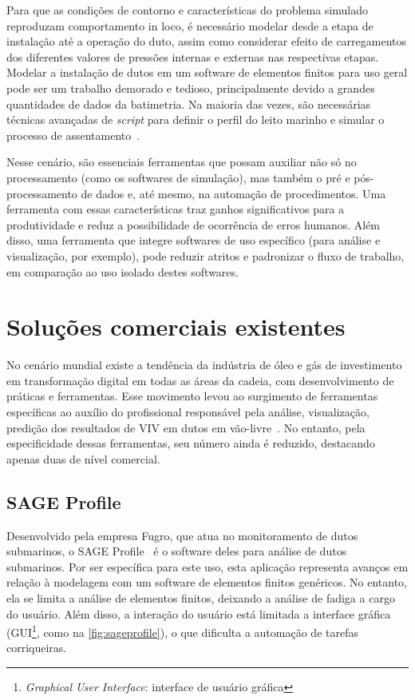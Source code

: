 Para que as condições de contorno e características do problema simulado reproduzam comportamento in loco, é necessário modelar desde a etapa de instalação até a operação do duto, assim como considerar efeito de carregamentos dos diferentes valores de pressões internas e externas nas respectivas etapas.
Modelar a instalação de dutos em um software de elementos finitos para uso geral pode ser um trabalho demorado e tedioso, principalmente devido a grandes quantidades de dados da batimetria.
Na maioria das vezes, são necessárias técnicas avançadas de \textit{script} para definir o perfil do leito marinho e simular o processo de assentamento~\cite{VandenAbeele2013}.

Nesse cenário, são essenciais ferramentas que possam auxiliar não só no processamento (como os softwares de simulação), mas também o pré e pós-processamento de dados e, até mesmo, na automação de procedimentos.
Uma ferramenta com essas características traz ganhos significativos para a produtividade e reduz a possibilidade de ocorrência de erros humanos.
Além disso, uma ferramenta que integre softwares de uso específico (para análise e visualização, por exemplo), pode reduzir atritos e padronizar o fluxo de trabalho, em comparação ao uso isolado destes softwares.


\section{Soluções comerciais existentes}


No cenário mundial existe a tendência da indústria de óleo e gás de investimento em transformação digital em todas as áreas da cadeia, com desenvolvimento de práticas e ferramentas. Esse movimento levou ao surgimento de ferramentas específicas ao auxílio do profissional responsável pela análise, visualização, predição dos resultados de VIV em dutos em vão-livre~\cite{Mittal2017}. No entanto, pela especificidade dessas ferramentas, seu número ainda é reduzido, destacando apenas duas de nível comercial.


\subsection{SAGE Profile}


Desenvolvido pela empresa Fugro, que atua no monitoramento de dutos submarinos, o SAGE Profile~\cite{sageprofile} é o software deles para análise de dutos submarinos. Por ser específica para este uso, esta aplicação representa avanços em relação à modelagem com um software de elementos finitos genéricos. No entanto, ela se limita a análise de elementos finitos, deixando a análise de fadiga a cargo do usuário. Além disso, a interação do usuário está limitada a interface gráfica (GUI\footnote{\textit{Graphical User Interface}: interface de usuário gráfica}, como na \autoref{fig:sageprofile}), o que dificulta a automação de tarefas corriqueiras.

